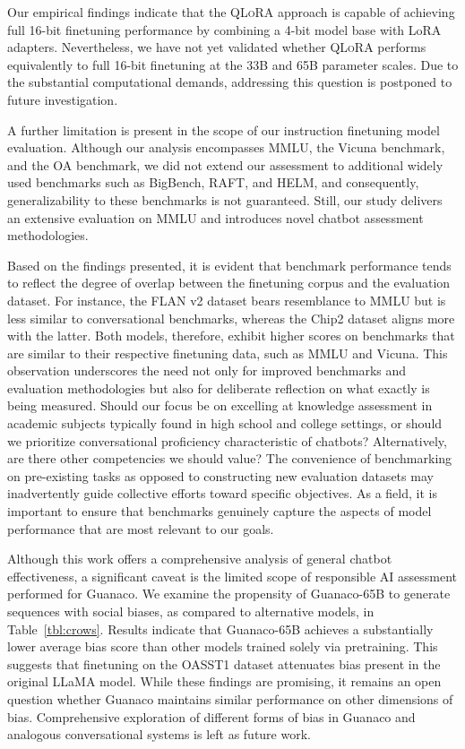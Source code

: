 Our empirical findings indicate that the \textsc{QLoRA} approach is capable of achieving full 16-bit finetuning performance by combining a 4-bit model base with LoRA adapters. Nevertheless, we have not yet validated whether \textsc{QLoRA} performs equivalently to full 16-bit finetuning at the 33B and 65B parameter scales. Due to the substantial computational demands, addressing this question is postponed to future investigation.

A further limitation is present in the scope of our instruction finetuning model evaluation. Although our analysis encompasses MMLU, the Vicuna benchmark, and the OA benchmark, we did not extend our assessment to additional widely used benchmarks such as BigBench, RAFT, and HELM, and consequently, generalizability to these benchmarks is not guaranteed. Still, our study delivers an extensive evaluation on MMLU and introduces novel chatbot assessment methodologies.

Based on the findings presented, it is evident that benchmark performance tends to reflect the degree of overlap between the finetuning corpus and the evaluation dataset. For instance, the FLAN v2 dataset bears resemblance to MMLU but is less similar to conversational benchmarks, whereas the Chip2 dataset aligns more with the latter. Both models, therefore, exhibit higher scores on benchmarks that are similar to their respective finetuning data, such as MMLU and Vicuna. This observation underscores the need not only for improved benchmarks and evaluation methodologies but also for deliberate reflection on what exactly is being measured. Should our focus be on excelling at knowledge assessment in academic subjects typically found in high school and college settings, or should we prioritize conversational proficiency characteristic of chatbots? Alternatively, are there other competencies we should value? The convenience of benchmarking on pre-existing tasks as opposed to constructing new evaluation datasets may inadvertently guide collective efforts toward specific objectives. As a field, it is important to ensure that benchmarks genuinely capture the aspects of model performance that are most relevant to our goals.

Although this work offers a comprehensive analysis of general chatbot effectiveness, a significant caveat is the limited scope of responsible AI assessment performed for {Guanaco}. We examine the propensity of {Guanaco}-65B to generate sequences with social biases, as compared to alternative models, in Table~\ref{tbl:crows}. Results indicate that {Guanaco}-65B achieves a substantially lower average bias score than other models trained solely via pretraining. This suggests that finetuning on the OASST1 dataset attenuates bias present in the original LLaMA model. While these findings are promising, it remains an open question whether {Guanaco} maintains similar performance on other dimensions of bias. Comprehensive exploration of different forms of bias in {Guanaco} and analogous conversational systems is left as future work.

